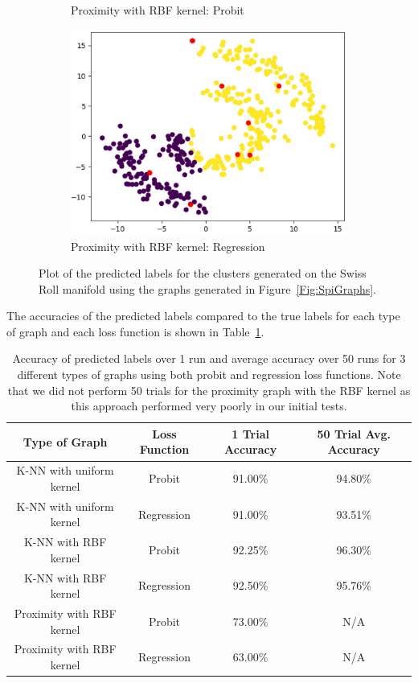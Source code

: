 \documentclass[12pt]{amsart}
\begin{document}
\begin{figure}[ht]
\begin{subfigure}{0.475\linewidth}
    \caption{Proximity with RBF kernel: Probit} 
    \label{Fig:SpiProxPro} 
  \end{subfigure}
      \begin{subfigure}{0.475\linewidth}
    \centering
    \includegraphics[width=0.8\linewidth]{Figures/SpiProxReg.png} 
    \caption{Proximity with RBF kernel: Regression} 
    \label{Fig:SpiProxReg} 
  \end{subfigure}
  \caption{Plot of the predicted labels for the clusters generated on the Swiss Roll manifold using the graphs generated in Figure~\ref{Fig:SpiGraphs}. }
  \label{Fig:SpiPred} 
\end{figure}
The accuracies of the predicted labels compared to the true labels for each type of graph and each loss function is shown in Table~\ref{Table:SpiRes}.
\begin{table}
\begin{center}
\begin{tabular}{||c c c c||} 
 \hline
 Type of Graph & Loss Function & 1 Trial Accuracy & 50 Trial Avg. Accuracy\\ 
 \hline\hline
 K-NN with uniform kernel & Probit & 91.00\% & 94.80\%\\ 
 \hline
 K-NN with uniform kernel & Regression & 91.00\% & 93.51\%\\
 \hline
 K-NN with RBF kernel & Probit & 92.25\% & 96.30\%\\
 \hline
 K-NN with RBF kernel & Regression & 92.50\% & 95.76\%\\
 \hline
 Proximity with RBF kernel & Probit & 73.00\% & N/A\\
 \hline
 Proximity with RBF kernel & Regression & 63.00\% & N/A\\
 \hline
\end{tabular}
\caption{Accuracy of predicted labels over 1 run and average accuracy over 50 runs for 3 different types of graphs using both probit and regression loss functions. Note that we did not perform 50 trials for the proximity graph with the RBF kernel as this approach performed very poorly in our initial tests.}
\label{Table:SpiRes}
\end{center}
\end{table}
\end{document}
